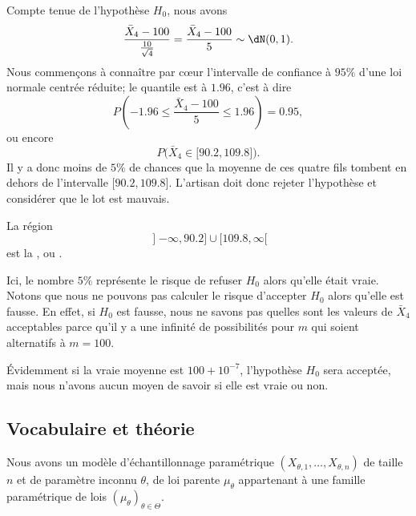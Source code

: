 Compte tenue de l'hypothèse \( H_0\), nous avons
\begin{equation}
    \frac{ \bar X_4-100 }{ \frac{ 10 }{ \sqrt{4} } }=\frac{ \bar X_4-100 }{ 5 }\sim\dN(0,1).
\end{equation}
Nous commençons à connaître par cœur l'intervalle de confiance à \( 95\%\) d'une loi normale centrée réduite; le quantile est à \( 1.96\), c'est à dire
\begin{equation}
    P\left( -1.96\leq\frac{ \bar X_4-100 }{ 5 }\leq 1.96 \right)=0.95,
\end{equation}
ou encore
\begin{equation}
    P\big( \bar X_4\in\mathopen[ 90.2 , 109.8 \mathclose] \big).
\end{equation}
Il y a donc moins de \( 5\%\) de chances que la moyenne de ces quatre fils tombent en dehors de l'intervalle \( \mathopen[ 90.2 , 109.8 \mathclose]\). L'artisan doit donc rejeter l'hypothèse et considérer que le lot est mauvais.

La région
\begin{equation}
    \mathopen] -\infty , 90.2 \mathclose]\cup\mathopen[ 109.8 , \infty [
\end{equation}
est la , ou .

Ici, le nombre \( 5\%\) représente le risque de refuser \( H_0\) alors qu'elle était vraie. Notons que nous ne pouvons pas calculer le risque d'accepter \( H_0\) alors qu'elle est fausse. En effet, si \( H_0\) est fausse, nous ne savons pas quelles sont les valeurs de \( \bar X_4\) acceptables parce qu'il y a une infinité de possibilités pour \( m\) qui soient alternatifs à \( m=100\).

Évidemment si la vraie moyenne est \( 100+10^{-7}\), l'hypothèse \( H_0\) sera acceptée, mais nous n'avons aucun moyen de savoir si elle est vraie ou non.

\subsection{Vocabulaire et théorie}

Nous avons un modèle d'échantillonnage paramétrique \(  (X_{\theta,1},\ldots,X_{\theta,n})  \) de taille \( n\) et de paramètre inconnu \( \theta\), de loi parente \( \mu_{\theta}\) appartenant à une famille paramétrique de lois \( (\mu_{\theta})_{\theta\in\Theta}\).

